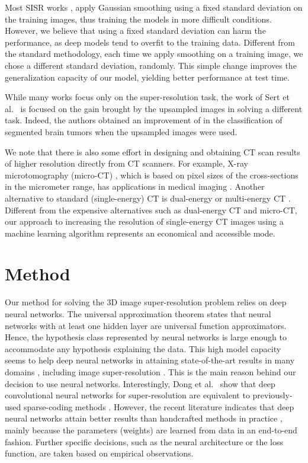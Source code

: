 \documentclass{ieeeaccess}
\begin{document}
Most SISR works \cite{Du-AS-2019, Shi-JBHI-2018, ZENG-CBM-2018}, apply Gaussian smoothing using a fixed standard deviation on the training images, thus training the models in more difficult conditions. However, we believe that using a fixed standard deviation can harm the performance, as deep models tend to overfit to the training data. Different from the standard methodology, each time we apply smoothing on a training image, we chose a different standard deviation, randomly. This simple change improves the generalization capacity of our model, yielding better performance at test time.

While many works focus only on the super-resolution task, the work of Sert et al.~\cite{Sert-MH-2019} is focused on the gain brought by the upsampled images in solving a different task. Indeed, the authors \cite{Sert-MH-2019} obtained an improvement of  in the classification of segmented brain tumors when the upsampled images were used.

We note that there is also some effort in designing and obtaining CT scan results of higher resolution directly from CT scanners. For example, X-ray microtomography (micro-CT) \cite{Elliott-JM-1982}, which is based on pixel sizes of the cross-sections in the micrometer range, has applications in medical imaging \cite{Enders-PO-2017, Tromba-AIP-2010}. Another alternative to standard (single-energy) CT is dual-energy or multi-energy CT \cite{McCollough-R-2015, Doerner-EJR-2017}. Different from the expensive alternatives such as dual-energy CT and micro-CT, our approach to increasing the resolution of single-energy CT images using a machine learning algorithm represents an economical and accessible mode.

\section{Method} 
\label{sec_Method}

Our method for solving the 3D image super-resolution problem relies on deep neural networks. The universal approximation theorem \cite{Cybenko-MCSS-1989,Hornik-NN-1991} states that neural networks with at least one hidden layer are universal function approximators. Hence, the hypothesis class represented by neural networks is large enough to accommodate any hypothesis explaining the data. This high model capacity seems to help deep neural networks in attaining state-of-the-art results in many domains \cite{LeCun-Nature-2015}, including image super-resolution \cite{Dong-TPAMI-2016}. This is the main reason behind our decision to use neural networks. Interestingly, Dong et al.~\cite{Dong-TPAMI-2016} show that deep convolutional neural networks for super-resolution are equivalent to previously-used sparse-coding methods \cite{Yang-TIP-2010}. However, the recent literature indicates that deep neural networks attain better results than handcrafted methods in practice \cite{Dong-TPAMI-2016,Ionescu-CVPR-2019}, mainly because the parameters (weights) are learned from data in an end-to-end fashion. Further specific decisions, such as the neural architecture or the loss function, are taken based on empirical observations.
\end{document}
